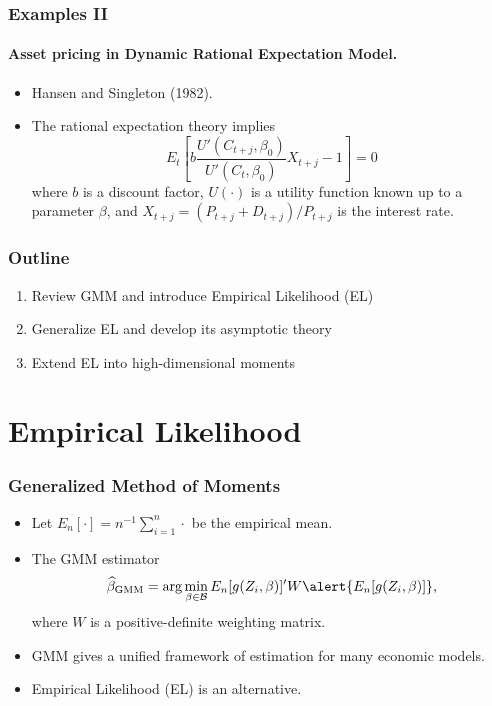 \documentclass{beamer}
\begin{document}
\begin{frame}
\frametitle{Examples II}
\framesubtitle{Asset pricing in Dynamic Rational Expectation Model.}
\begin{itemize}
\item  Hansen and Singleton (1982).
\item The rational expectation theory implies
\[
E_t \left[ b \frac{U'(C_{t+j}, \beta_0)}{U'(C_t, \beta_0)} X_{t+j} - 1  \right]
= 0
\] where \(b\) is a discount factor, \(U(\cdot)\) is a utility function known
up to a parameter \(\beta\), and \(X_{t+j} = (P_{t+j} + D_{t+j})/P_{t+j} \) is the interest rate.
\end{itemize}
\end{frame}


\begin{frame}
\frametitle{Outline}

\begin{enumerate}
\item Review GMM and introduce Empirical Likelihood (EL) \pause
\item Generalize EL and develop its asymptotic theory \pause
\item Extend EL into high-dimensional moments
\end{enumerate}

\end{frame}

\section[EL]{Empirical Likelihood}
\frame{\sectionpage}

\begin{frame}
\frametitle{Generalized Method of Moments}

\begin{itemize}
\item Let $E_n [\cdot] = n^{-1} \sum_{i=1}^n \cdot$ be the empirical mean.
\item The GMM estimator 
\[ 
\widehat{\beta}_{\mathrm{GMM}} = \arg \min_{\beta \in \mathcal{B}}
E_n[g(Z_i,\beta)]^\prime W \alert{E_n[g(Z_i,\beta)]},
\]
where $W$ is a positive-definite weighting matrix. \pause
\item GMM gives a unified framework of estimation for many economic models.
\item Empirical Likelihood (EL) is an alternative.
\end{itemize}
\end{frame}
\end{document}
